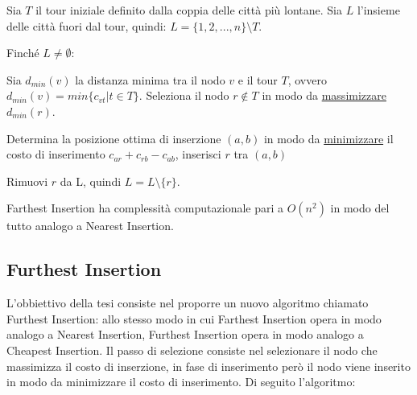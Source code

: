 \documentclass[a4paper,12pt]{report}
\begin{document}
\begin{tcolorbox}[colframe=black,colback=white,boxrule=0.5pt, sharp corners, breakable]
\begin{legal}
  \item Sia $T$ il tour iniziale definito dalla coppia delle città più lontane. Sia $L$ l'insieme delle città fuori dal tour, quindi: $L = \{1, 2, ..., n\} \setminus T$.
  \item Finché $L \neq \emptyset$:
  \begin{legal}
    \item Sia $d_{min}(v)$ la distanza minima tra il nodo $v$ e il tour $T$, ovvero $d_{min}(v) = min\{c_{vt} | t \in T \}$. Seleziona il nodo $r \not \in T$ in modo da \underline{massimizzare} $d_{min}(r)$.
    \item Determina la posizione ottima di inserzione $(a, b)$ in modo da \underline{minimizzare} il costo di inserimento $c_{ar} + c_{rb} - c_{ab}$, inserisci $r$ tra $(a, b)$
    \item Rimuovi $r$ da L, quindi $L = L \setminus \{r\}$.
  \end{legal}
\end{legal}
\end{tcolorbox}
\hfill \break Farthest Insertion ha complessità computazionale pari a $O(n^2)$ in modo del tutto analogo a Nearest Insertion.

\subsection{Furthest Insertion} \label{ssec:FuI}
L'obbiettivo della tesi consiste nel proporre un nuovo algoritmo chiamato Furthest Insertion: allo stesso modo in cui Farthest Insertion opera in modo analogo a Nearest Insertion, Furthest Insertion opera in modo analogo a Cheapest Insertion. Il passo di selezione consiste nel selezionare il nodo che massimizza il costo di inserzione, in fase di inserimento però il nodo viene inserito in modo da minimizzare il costo di inserimento. Di seguito l'algoritmo:
\end{document}
